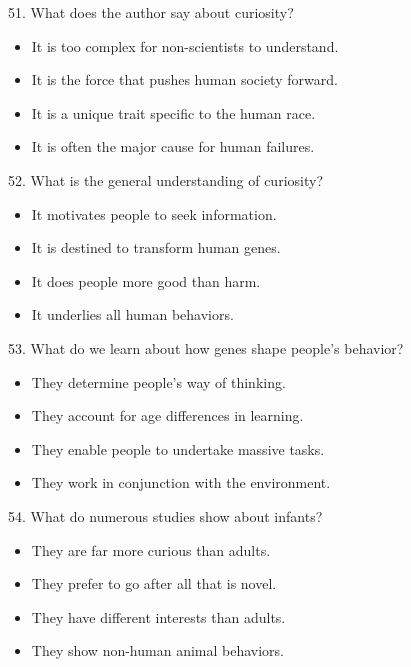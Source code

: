 \documentclass[UTF8,11pt]{ctexart}
\begin{document}
51. What does the author say about curiosity?


\begin{itemize}[leftmargin=2em,itemsep=.2em,topsep=.4em]\item[A.] It is too complex for non-scientists to understand.
\item[B.] It is the force that pushes human society forward.
\item[C.] It is a unique trait specific to the human race.
\item[D.] It is often the major cause for human failures.
\end{itemize}

52. What is the general understanding of curiosity?


\begin{itemize}[leftmargin=2em,itemsep=.2em,topsep=.4em]\item[A.] It motivates people to seek information.
\end{itemize}

\begin{itemize}[leftmargin=2em,itemsep=.2em,topsep=.4em]\item[B.] It is destined to transform human genes.
\item[C.] It does people more good than harm.
\item[D.] It underlies all human behaviors.
\end{itemize}

53. What do we learn about how genes shape people's behavior?


\begin{itemize}[leftmargin=2em,itemsep=.2em,topsep=.4em]\item[A.] They determine people's way of thinking.
\item[B.] They account for age differences in learning.
\item[C.] They enable people to undertake massive tasks.
\item[D.] They work in conjunction with the environment.
\end{itemize}

54. What do numerous studies show about infants?


\begin{itemize}[leftmargin=2em,itemsep=.2em,topsep=.4em]\item[A.] They are far more curious than adults.
\item[B.] They prefer to go after all that is novel.
\item[C.] They have different interests than adults.
\item[D.] They show non-human animal behaviors.
\end{itemize}
\end{document}
